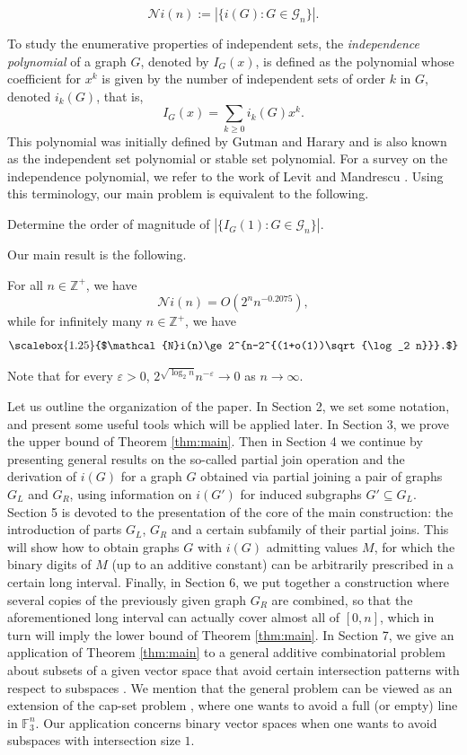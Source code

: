 \documentclass[10pt,a4paper]{article}
\numberwithin{equation}{section}
\newcommand{\zz}{\mathbb{Z}}
\newcommand{\F}{\mathbb{F}}
\newcommand{\eps}{\varepsilon}
\newcommand{\cG}{\mathcal{G}}
\newcommand{\cNi}{\mathcal{N}i}
\begin{document}
\begin{definition}
    $$\cNi(n):=|\{ i(G): G\in \cG_n\}|.$$
\end{definition}

To study the enumerative properties of independent sets, the \textit{independence polynomial} of a graph $G$, denoted by $I_G(x)$, is defined 
as the polynomial whose coefficient for $x^k$ is given by the number of independent sets of order $k$ in $G$, denoted $i_k(G)$, that is, $$I_G(x) = \sum_{k\ge 0} i_k(G)x^{k}.$$
 This polynomial was initially defined by Gutman and Harary \cite{Gutman} and is also known as the independent set polynomial or stable set polynomial. For a survey on the independence polynomial, we refer to the work of Levit and Mandrescu \cite{Levit}.
Using this terminology, our main problem is equivalent to the following.

\begin{problem}
   Determine the order of magnitude of $|\{I_G(1): G\in \cG_n\}|.$
\end{problem}
Our main result is the following.

\begin{theorem}\label{thm:main}
For all $n\in \zz^{+}$, we have
$$\cNi(n)=O(2^n n^{-0.2075}),$$
 while for infinitely many $n\in \zz^{+}$, we have 
 $$\scalebox{1.25}{$\cNi(n)\ge 2^{n-2^{(1+o(1))\sqrt{\log_2 n}}}.$}$$
\end{theorem}
Note that for every $\eps>0$,  ${2^{\sqrt{\log_2 n}}}{n^{-\eps}}\to 0$ as $n\to \infty$.





Let us outline the organization of the paper. In Section 2, we set some notation, and present some useful tools which will be applied later. In Section 3, we prove the upper bound of Theorem \ref{thm:main}. Then in Section 4 we continue by presenting general results on the so-called partial join operation and the derivation of $i(G)$ for a graph $G$ obtained via partial joining a pair of graphs $G_L$ and $G_R$, using information on $i(G')$ for induced subgraphs $G'\subseteq G_L$.
Section 5 is devoted to the presentation of the core of the main construction: the introduction of parts $G_L$, $G_R$ and a certain subfamily of their partial joins. This will show how to obtain graphs $G$ with $i(G)$ admitting values $M$, for which the binary digits of $M$ (up to an additive constant) can be arbitrarily prescribed in a certain long interval. Finally, in Section 6, we put together a construction where several copies of the previously given graph $G_R$ are combined, so that the aforementioned long interval can actually cover almost all of $[0,n]$, which in turn will imply the lower bound of Theorem \ref{thm:main}. In Section 7, we give an application of Theorem \ref{thm:main} to a general additive combinatorial problem about subsets of a given vector space that avoid certain intersection patterns with respect to subspaces \cite{codebased, KN25}. We mention that the general problem can be viewed as an extension of the cap-set problem \cite{EG}, where one wants to avoid a full (or empty) line in $\F_3^n$. Our application concerns binary vector spaces when one wants to avoid subspaces with intersection size $1$.
\end{document}

